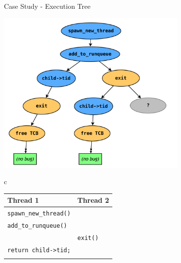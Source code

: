 \documentclass[xcolor=dvipsnames]{beamer}
\begin{document}
\begin{frame}{Case Study - Execution Tree}
	\begin{center}
		\includegraphics[width=0.7\textwidth]{threadfork1.pdf}
		\hspace{-0.5in} {\tiny 
		\begin{tabular}{c}
			\begin{tabular}{|l|l|}
				\hline
				\cellcolor{thread1} {\bf Thread 1} & \cellcolor{thread2} {\bf Thread 2} \\
				\hline
				{\tt spawn\_new\_thread()} & \\
				\hline
				{\tt add\_to\_runqueue()} & \\
				\hline
				& {\tt exit()} \\
				\hline
				{\tt return child->tid;} & \\
				\hline
				& {\tt <free TCB>} \\
				\hline
			\end{tabular}
			\\ \\ \\ \\ \\ \\ \\ \\
			\\ \\ \\ \\ \\ \\ \\ \\
			\\ \\ \\ \\ \\ \\ \\ \\

\end{tabular}}
\end{center}
\end{frame}
\end{document}
